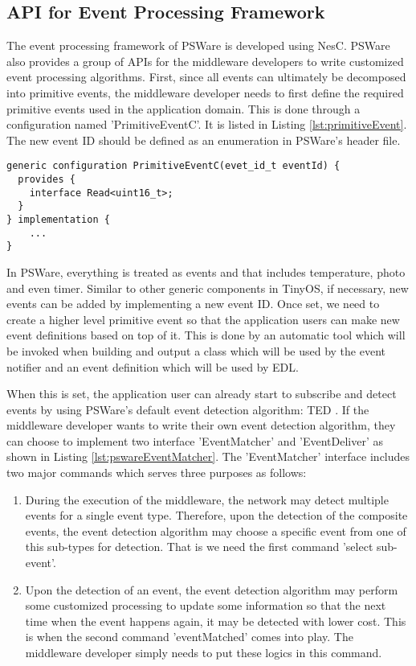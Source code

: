\subsection{API for Event Processing Framework}
The event processing framework of PSWare is developed using NesC. PSWare also provides a group of APIs for the middleware developers to write customized event processing algorithms. First, since all events can ultimately be decomposed into primitive events, the middleware developer needs to first define the required primitive events used in the application domain. This is done through a configuration named 'PrimitiveEventC'. It is listed in Listing \ref{lst:primitiveEvent}. The new event ID should be defined as an enumeration in PSWare's header file.
\begin{lstlisting}[caption=Primitive event component in NesC, label=lst:primitiveEvent]
generic configuration PrimitiveEventC(evet_id_t eventId) {
  provides {
    interface Read<uint16_t>;
  }
} implementation {
	...
}
\end{lstlisting}

In PSWare, everything is treated as events and that includes temperature, photo and even timer. Similar to other generic components in TinyOS, if necessary, new events can be added by implementing a new event ID. Once set, we need to create a higher level primitive event so that the application users can make new event definitions based on top of it. This is done by an automatic tool which will be invoked when building and output a class which will be used by the event notifier and an event definition which will be used by EDL.

When this is set, the application user can already start to subscribe and detect events by using PSWare's default event detection algorithm: TED \cite{lai:ted}. If the middleware developer wants to write their own event detection algorithm, they can choose to implement two interface 'EventMatcher' and 'EventDeliver' as shown in Listing \ref{lst:pswareEventMatcher}. The 'EventMatcher' interface includes two major commands which serves three purposes as follows:
\begin{enumerate}
\item During the execution of the middleware, the network may detect multiple events for a single event type. Therefore, upon the detection of the composite events, the event detection algorithm may choose a specific event from one of this sub-types for detection. That is we need the first command 'select sub-event'.
\item Upon the detection of an event, the event detection algorithm may perform some customized processing to update some information so that the next time when the event happens again, it may be detected with lower cost. This is when the second command 'eventMatched' comes into play. The middleware developer simply needs to put these logics in this command.
\end{enumerate}

